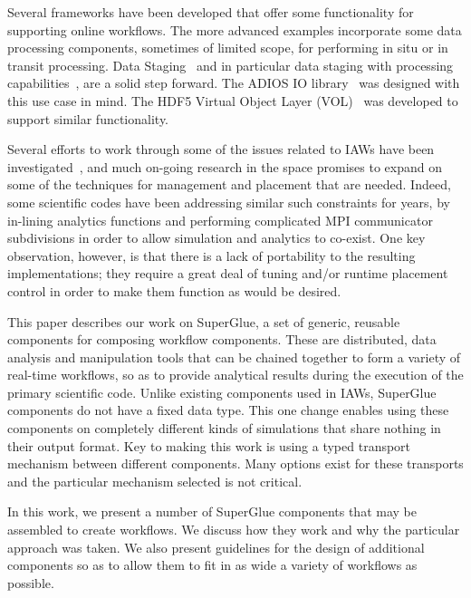 \documentclass[conference]{IEEEtran}
\begin{document}
Several frameworks have been developed that offer some functionality for
supporting online workflows. The more advanced examples incorporate some data
processing components, sometimes of limited scope, for performing in situ or in
transit processing. Data Staging~\cite{nisar:2008:staging} and in particular
data staging with processing
capabilities~\cite{abbasi:2009:datastaging,ober:seismic}, are a solid step
forward. The ADIOS IO library~\cite{lofstead:2009:adaptable} was designed with
this use case in mind. The HDF5 Virtual Object Layer
(VOL)~\cite{chaarawi:2013:hdf5-vol} was developed to support similar
functionality.

Several efforts to work through some of the issues related to IAWs have been
investigated~\cite{karimabadi:2013:catalyst,whitlock:2011:libsim,Glean,Flexpath,dreher:2016:bredala,zheng:2010:predata},
and much on-going research in the space promises to expand on some of the
techniques for management and placement that are needed.  Indeed, some
scientific codes have been addressing similar such constraints for years, by
in-lining analytics functions and performing complicated MPI communicator
subdivisions in order to allow simulation and analytics to co-exist.  One key
observation, however, is that there is a lack of portability to the resulting
implementations; they require a great deal of tuning and/or runtime placement
control in order to make them function as would be desired.

This paper describes our work on SuperGlue, a set of generic, reusable
components for composing workflow components. These are distributed, data
analysis and manipulation tools that can be chained together to form a variety
of real-time workflows, so as to provide analytical results during the
execution of the primary scientific code. Unlike existing components used in
IAWs, SuperGlue components do not have a fixed data type. This one change
enables using these components on completely different kinds of simulations
that share nothing in their output format. Key to making this work is using a
typed transport mechanism between different components. Many options exist for
these transports and the particular mechanism selected is not critical. 

In this work, we present a number of SuperGlue components that may be
assembled to create workflows. We discuss how they work and why the particular
approach was taken.  We also present guidelines for the design of additional
components so as to allow them to fit in as wide a variety of workflows as
possible. 
\end{document}
